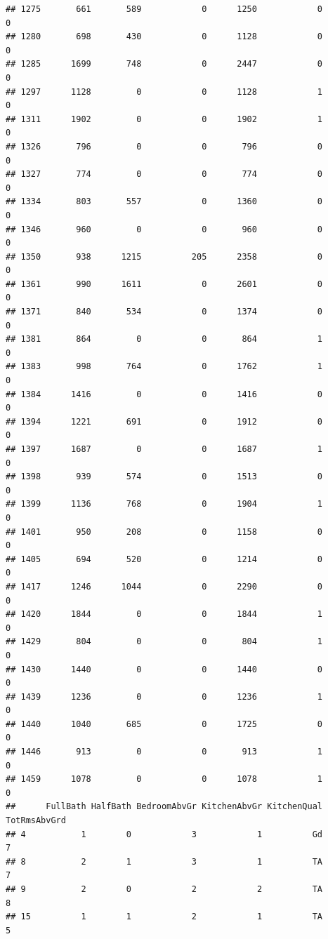 \documentclass[]{article}
\begin{document}
\begin{verbatim}
## 1275       661       589            0      1250            0            0
## 1280       698       430            0      1128            0            0
## 1285      1699       748            0      2447            0            0
## 1297      1128         0            0      1128            1            0
## 1311      1902         0            0      1902            1            0
## 1326       796         0            0       796            0            0
## 1327       774         0            0       774            0            0
## 1334       803       557            0      1360            0            0
## 1346       960         0            0       960            0            0
## 1350       938      1215          205      2358            0            0
## 1361       990      1611            0      2601            0            0
## 1371       840       534            0      1374            0            0
## 1381       864         0            0       864            1            0
## 1383       998       764            0      1762            1            0
## 1384      1416         0            0      1416            0            0
## 1394      1221       691            0      1912            0            0
## 1397      1687         0            0      1687            1            0
## 1398       939       574            0      1513            0            0
## 1399      1136       768            0      1904            1            0
## 1401       950       208            0      1158            0            0
## 1405       694       520            0      1214            0            0
## 1417      1246      1044            0      2290            0            0
## 1420      1844         0            0      1844            1            0
## 1429       804         0            0       804            1            0
## 1430      1440         0            0      1440            0            0
## 1439      1236         0            0      1236            1            0
## 1440      1040       685            0      1725            0            0
## 1446       913         0            0       913            1            0
## 1459      1078         0            0      1078            1            0
##      FullBath HalfBath BedroomAbvGr KitchenAbvGr KitchenQual TotRmsAbvGrd
## 4           1        0            3            1          Gd            7
## 8           2        1            3            1          TA            7
## 9           2        0            2            2          TA            8
## 15          1        1            2            1          TA            5

\end{verbatim}
\end{document}
